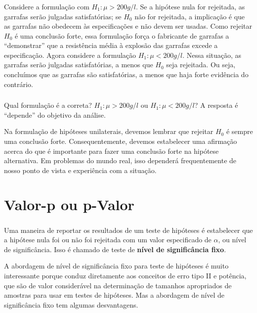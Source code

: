 \documentclass[14pt,aspectratio=1610]{beamer}
\newcommand{\Ho}{\ensuremath{H_{0}}}
\begin{document}
\begin{frame}{}
\frametitle{}
\begin{block}{}
\justifying
Considere a formulação com $H_{1}:\mu> 200 g/l$. Se a hipótese nula for rejeitada, as garrafas serão julgadas satisfatórias; se $\Ho$ não for rejeitada, a implicação é 
que as garrafas não obedecem às especificações e não devem ser usadas. Como rejeitar $\Ho$ é uma conclusão forte, essa formulação força o fabricante de garrafas a 
``demonstrar'' que a resistência média à explosão das garrafas excede a especificação. Agora considere a formulação $H_{1}:\mu< 200 g/l$. Nessa situação, as garrafas 
serão julgadas satisfatórias, a menos que $\Ho$ seja rejeitada. Ou seja, concluímos que as garrafas são satisfatórias, a menos que haja forte evidência do contrário.
\end{block}
\end{frame}

\begin{frame}{}
\frametitle{}
\begin{block}{}
\justifying
Qual formulação é a correta? $H_{1}:\mu> 200 g/l$ ou $H_{1}:\mu< 200 g/l$? \pause A resposta é ``depende'' do objetivo da análise.
\end{block}
\pause
\begin{block}{}
Na formulação de hipóteses unilaterais, devemos lembrar que rejeitar $\Ho$ é sempre uma conclusão forte. Consequentemente, devemos estabelecer uma afirmação 
acerca do que é importante para fazer uma conclusão forte na hipótese alternativa. Em problemas do mundo real, isso dependerá frequentemente de nosso ponto de 
vista e experiência com a situação.
\end{block}
\end{frame}

\section{Valor-p ou p-Valor}
\begin{frame}{}
\frametitle{}
\begin{block}{}
\justifying
Uma maneira de reportar os resultados de um teste de hipóteses é estabelecer que a hipótese nula foi ou não foi rejeitada com um valor especificado de $\alpha$, ou 
nível de significância. Isso é chamado de teste de\textbf{ nível de significância fixo}.
\end{block}
\pause
\begin{block}{}
\justifying
A abordagem de nível de significância fixo para teste de hipóteses é muito interessante porque conduz diretamente aos conceitos de erro tipo II e potência, que são 
de valor considerável na determinação de tamanhos apropriados de amostras para usar em testes de hipóteses. Mas a abordagem de nível de significância fixo tem 
algumas desvantagens.
\end{block}
\end{frame}
\end{document}
